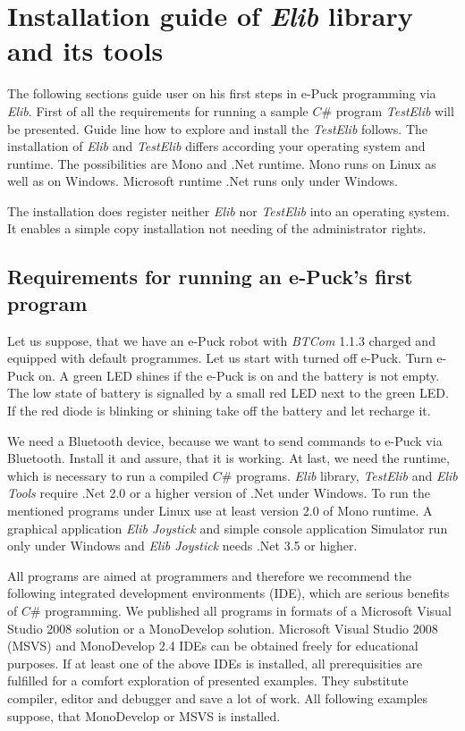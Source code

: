 \chapter{Installation guide of {\it Elib} library and its tools} 
  \label{app:installelib}
  The following sections guide user on his first steps in e-Puck programming via {\it Elib}.
  First of all the requirements for running a sample $C\#$ program {\it TestElib} will be presented.
  Guide line how to explore and install the {\it TestElib} follows.
  The installation of {\it Elib} and {\it TestElib} differs 
  according your operating system and runtime.
  The possibilities are Mono \cite{mono} and .Net runtime. 
  Mono runs on Linux as well as on Windows. Microsoft runtime .Net
  runs only under Windows.

  The installation does register neither {\it Elib} nor {\it TestElib} into an operating system. 
  It enables a simple copy installation not needing of the administrator rights.
  \section{Requirements for running an e-Puck's first program}
  \label{sec:require}
  Let us suppose, that we have an e-Puck robot with {\it BTCom} 1.1.3 charged 
  and equipped with default programmes.
  Let us start with turned off e-Puck. Turn e-Puck on.
  A green LED shines if the e-Puck is on and the battery is not empty.
  The low state of battery is signalled by a small red LED next to the green LED. 
  If the red diode is blinking or shining take off the battery and let recharge it.

  We need a Bluetooth device, because we want to send commands to e-Puck via Bluetooth. Install it and assure,
  that it is working.
  At last, we need the runtime, which is necessary to run a compiled $C\#$ programs. 
  {\it Elib} library, {\it TestElib} and {\it Elib Tools} require .Net 2.0 or a higher version of .Net under Windows.
  To run the mentioned programs under Linux use at least version 2.0 of Mono runtime.
  A graphical application {\it Elib Joystick} and simple console application Simulator
  run only under Windows and {\it Elib Joystick} needs .Net 3.5 or higher.

  All programs are aimed at programmers and therefore we recommend the following 
  integrated development environments (IDE),
  which are serious benefits of $C\#$ programming.
  We published all programs in formats of 
  a Microsoft Visual Studio 2008 solution or a MonoDevelop solution.  
  Microsoft Visual Studio 2008 (MSVS) and MonoDevelop 2.4 IDEs 
  can be obtained freely for educational purposes.
  If at least one of the above IDEs is installed, all prerequisities 
  are fulfilled for a comfort exploration of presented examples. 
  They substitute compiler, editor and debugger and save a lot of work.
  All following examples suppose, that MonoDevelop or MSVS is installed.

